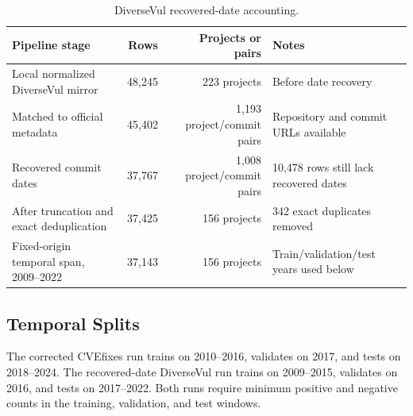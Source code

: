 \documentclass[a4paper,fleqn]{cas-dc}
\begin{document}
\begin{table}
\centering
\caption{Temporal exports after exact duplicate removal.}
\label{tab:datasets}
\end{table}

\begin{table}
\centering
\caption{DiverseVul recovered-date accounting.}
\label{tab:diversevul-accounting}
\small
\begin{tabular}{lrrl}
\toprule
Pipeline stage & Rows & Projects or pairs & Notes \\
\midrule
Local normalized DiverseVul mirror & 48,245 & 223 projects & Before date recovery \\
Matched to official metadata & 45,402 & 1,193 project/commit pairs & Repository and commit URLs available \\
Recovered commit dates & 37,767 & 1,008 project/commit pairs & 10,478 rows still lack recovered dates \\
After truncation and exact deduplication & 37,425 & 156 projects & 342 exact duplicates removed \\
Fixed-origin temporal span, 2009--2022 & 37,143 & 156 projects & Train/validation/test years used below \\
\bottomrule
\end{tabular}
\end{table}

\subsection{Temporal Splits}

The corrected CVEfixes run trains on 2010--2016, validates on 2017, and tests
on 2018--2024. The recovered-date DiverseVul run trains on 2009--2015,
validates on 2016, and tests on 2017--2022. Both runs require minimum positive
and negative counts in the training, validation, and test windows.
\end{document}
